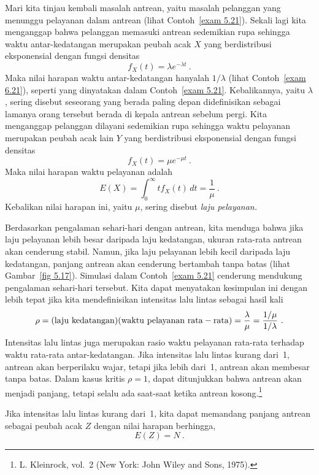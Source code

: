 {\begin{example}\label{exam 6.24} Mari kita tinjau kembali masalah antrean, yaitu
masalah pelanggan yang menunggu pelayanan dalam antrean (lihat Contoh~\ref{exam
5.21}). Sekali lagi kita menganggap bahwa pelanggan memasuki antrean sedemikian rupa
sehingga waktu antar-kedatangan merupakan peubah acak $X$ yang berdistribusi
eksponensial dengan fungsi densitas
$$ f_X(t) = \lambda e^{-\lambda t}\ .
$$ Maka nilai harapan waktu antar-kedatangan hanyalah $1/\lambda$ (lihat
Contoh~\ref{exam 6.21}), seperti yang dinyatakan dalam Contoh~\ref{exam 5.21}.
Kebalikannya, yaitu $\lambda$, sering disebut   seseorang yang berada paling depan didefinisikan sebagai lamanya orang
tersebut berada di kepala antrean sebelum pergi. Kita menganggap pelanggan dilayani
sedemikian rupa sehingga waktu pelayanan merupakan peubah acak lain $Y$ yang
berdistribusi eksponensial dengan fungsi densitas
$$ f_X(t) = \mu e^{-\mu t}\ .
$$ Maka nilai harapan waktu pelayanan adalah
$$ E(X) = \int_0^\infty t f_X(t)\, dt = \frac 1\mu\ .
$$ Kebalikan nilai harapan ini, yaitu $\mu$, sering disebut {\em laju pelayanan.}
\par Berdasarkan pengalaman sehari-hari dengan antrean, kita menduga bahwa jika laju
pelayanan lebih besar daripada laju kedatangan, ukuran rata-rata antrean akan cenderung
stabil. Namun, jika laju pelayanan lebih kecil daripada laju kedatangan, panjang
antrean akan cenderung bertambah tanpa batas (lihat Gambar~\ref{fig 5.17}). Simulasi
dalam Contoh~\ref{exam 5.21} cenderung mendukung pengalaman sehari-hari tersebut. Kita
dapat menyatakan kesimpulan ini dengan lebih tepat jika kita mendefinisikan \emx
{intensitas lalu lintas} sebagai hasil kali
$$
\rho = ({\rm laju\ kedatangan})({\rm waktu\ pelayanan\ rata-rata}) = \frac \lambda\mu =
\frac {1/\mu}{1/\lambda}\ .
$$ Intensitas lalu lintas juga merupakan rasio waktu pelayanan rata-rata terhadap
waktu rata-rata antar-kedatangan. Jika intensitas lalu lintas kurang dari~1, antrean
akan berperilaku wajar, tetapi jika lebih dari~1, antrean akan membesar tanpa
batas. Dalam kasus kritis $\rho = 1$, dapat ditunjukkan bahwa antrean akan menjadi
panjang, tetapi selalu ada saat-saat ketika antrean kosong.\footnote{L.
Kleinrock,   vol.~2 (New York: John Wiley and Sons, 1975).}

Jika intensitas lalu lintas kurang dari~1, kita dapat memandang panjang antrean sebagai
peubah acak $Z$ dengan nilai harapan berhingga,
$$ E(Z) = N\ .
$$


\end{example}}
